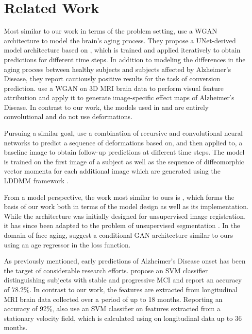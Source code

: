 \chapter{Related Work}
Most similar to our work in terms of the problem setting, \cite{wegmayr2019generative} use a WGAN architecture to model the brain's aging process. They propose a UNet-derived model architecture based on \cite{baumgartner2018visual}, which is trained and applied iteratively to obtain predictions for different time steps. In addition to modeling the differences in the aging process between healthy subjects and subjects affected by Alzheimer's Disease, they report cautiously positive results for the task of conversion prediction.
\cite{baumgartner2018visual} use a WGAN on 3D MRI brain data to perform visual feature attribution and apply it to generate image-specific effect maps of Alzheimer's Disease.
In contrast to our work, the models used in \cite{wegmayr2019generative} and \cite{baumgartner2018visual} are entirely convolutional and do not use deformations.

Pursuing a similar goal, \cite{pathan2018predictive} use a combination of recursive and convolutional neural networks to predict a sequence of deformations based on, and then applied to, a baseline image to obtain follow-up predictions at different time steps. The model is trained on the first image of a subject as well as the sequence of diffeomorphic vector momenta for each additional image which are generated using the LDDMM framework \cite{beg2005computing}.

From a model perspective, the work most similar to ours is \cite{balakrishnan2019voxelmorph} \cite{dalca2018unsupervised}, which forms the basis of our work both in terms of the model design as well as its implementation. While the architecture was initially designed for unsupervised image registration, it has since been adapted to the problem of unsupervised segmentation \cite{dalca2019unsupervised}.
In the domain of face aging, \cite{palsson2018generative} suggest a conditional GAN \cite{mirza2014conditional} architecture similar to ours using an age regressor in the loss function.

As previously mentioned, early predictions of Alzheimer's Disease onset has been the target of considerable research efforts. \cite{thung2016identification} propose an SVM classifier distinguishing subjects with stable and progressive MCI and report an accuracy of 78.2\%. In contrast to our work, the features are extracted from longitudinal MRI brain data collected over a period of up to 18 months.
Reporting an accuracy of 92\%, \cite{sun2017detection} also use an SVM classifier on features extracted from a stationary velocity field, which is calculated using \cite{vercauteren2009diffeomorphic} on longitudinal data up to 36 months.


